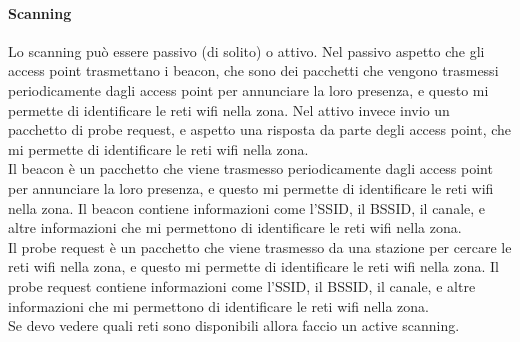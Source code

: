\paragraph{Scanning}
Lo scanning può essere passivo (di solito) o attivo. Nel passivo aspetto che gli access point trasmettano i beacon, che sono dei pacchetti che vengono trasmessi periodicamente dagli access point per annunciare la loro presenza, e questo mi permette di identificare le reti wifi nella zona. Nel attivo invece invio un pacchetto di probe request, e aspetto una risposta da parte degli access point, che mi permette di identificare le reti wifi nella zona.\\
Il beacon è un pacchetto che viene trasmesso periodicamente dagli access point per annunciare la loro presenza, e questo mi permette di identificare le reti wifi nella zona. Il beacon contiene informazioni come l'SSID, il BSSID, il canale, e altre informazioni che mi permettono di identificare le reti wifi nella zona.\\
Il probe request è un pacchetto che viene trasmesso da una stazione per cercare le reti wifi nella zona, e questo mi permette di identificare le reti wifi nella zona. Il probe request contiene informazioni come l'SSID, il BSSID, il canale, e altre informazioni che mi permettono di identificare le reti wifi nella zona.\\
Se devo vedere quali reti sono disponibili allora faccio un active scanning. 

